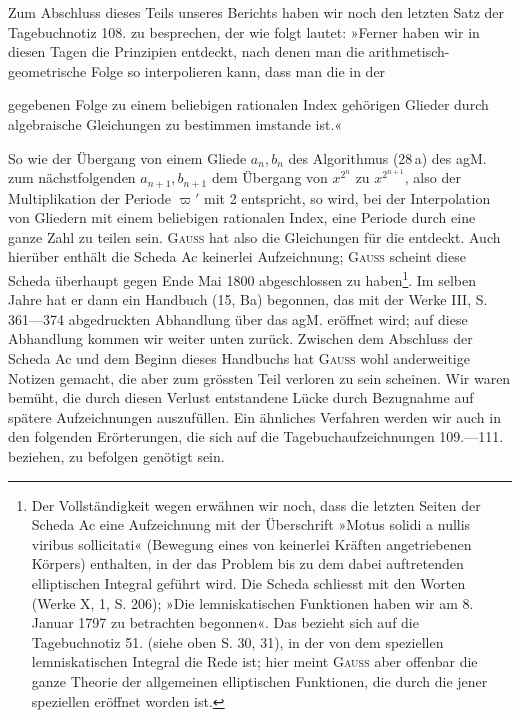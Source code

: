 Zum Abschluss dieses Teils unseres Berichts haben wir noch den letzten
Satz der Tagebuchnotiz 108. zu besprechen, der wie folgt lautet: »Ferner
haben wir in diesen Tagen die Prinzipien entdeckt, nach denen man die
arithmetisch-geometrische Folge so interpolieren kann, dass man die in der\par
\clearpage{}
\noindent gegebenen Folge zu einem beliebigen rationalen Index gehörigen Glieder
durch algebraische Gleichungen zu bestimmen imstande ist.«

So wie der Übergang von einem Gliede \(a_n,b_n\) des Algorithmus (28\,a) des
agM. zum nächstfolgenden \(a_{n+1},b_{n+1}\) dem Übergang von \(x^{2^n}\) zu \(x^{2^{n+1}}\), also
der Multiplikation der Periode \(\varpi'\) mit 2 entspricht, so wird, bei der Interpolation von Gliedern mit einem beliebigen rationalen Index, eine Periode
durch eine ganze Zahl zu teilen sein. \textsc{Gauss} hat also die Gleichungen für
die  entdeckt. Auch hierüber enthält die Scheda Ac
keinerlei Aufzeichnung; \textsc{Gauss} scheint diese Scheda überhaupt gegen Ende
Mai 1800 abgeschlossen zu haben\footnote{Der Vollständigkeit wegen erwähnen wir noch, dass die letzten Seiten der Scheda Ac eine Aufzeichnung mit der Überschrift »Motus solidi a nullis viribus sollicitati« (Bewegung eines von keinerlei Kräften angetriebenen Körpers) enthalten, in der das Problem bis zu dem dabei auftretenden elliptischen Integral geführt wird. Die Scheda schliesst mit den Worten (Werke X, 1, S. 206); »Die lemniskatischen Funktionen haben wir am 8. Januar 1797 zu betrachten begonnen«. Das bezieht sich auf die Tagebuchnotiz 51. (siehe oben S. 30, 31), in der von dem speziellen lemniskatischen Integral die Rede ist; hier meint \textsc{Gauss} aber offenbar die ganze Theorie der allgemeinen elliptischen Funktionen, die durch die jener speziellen eröffnet worden ist.}. Im selben Jahre hat er dann ein
Handbuch (15, Ba) begonnen, das mit der Werke III, S. 361—374 abgedruckten
Abhandlung über das agM. eröffnet wird; auf diese Abhandlung kommen wir
weiter unten zurück. Zwischen dem Abschluss der Scheda Ac und dem Beginn dieses Handbuchs hat \textsc{Gauss} wohl anderweitige Notizen gemacht, die
aber zum grössten Teil verloren zu sein scheinen. Wir waren bemüht, die
durch diesen Verlust entstandene Lücke durch Bezugnahme auf spätere Aufzeichnungen auszufüllen. Ein ähnliches Verfahren werden wir auch in den
folgenden Erörterungen, die sich auf die Tagebuchaufzeichnungen 109.—111.
beziehen, zu befolgen genötigt sein.
